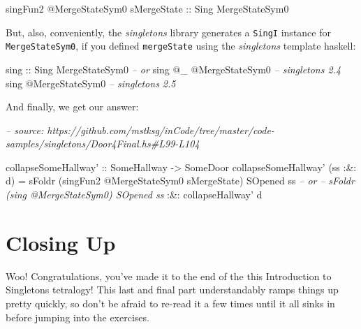 \documentclass[]{article}
\newenvironment{Shaded}{}{}
\newcommand{\CommentTok}[1]{\textcolor[rgb]{0.38,0.63,0.69}{\textit{#1}}}
\newcommand{\DataTypeTok}[1]{\textcolor[rgb]{0.56,0.13,0.00}{#1}}
\newcommand{\FunctionTok}[1]{\textcolor[rgb]{0.02,0.16,0.49}{#1}}
\newcommand{\NormalTok}[1]{#1}
\newcommand{\OtherTok}[1]{\textcolor[rgb]{0.00,0.44,0.13}{#1}}
\begin{document}
\begin{Shaded}
\begin{Highlighting}[]
\NormalTok{singFun2 }\FunctionTok{@}\DataTypeTok{MergeStateSym0}\NormalTok{ sMergeState}
\OtherTok{    ::} \DataTypeTok{Sing} \DataTypeTok{MergeStateSym0}
\end{Highlighting}
\end{Shaded}

But, also, conveniently, the \emph{singletons} library generates a
\texttt{SingI} instance for \texttt{MergeStateSym0}, if you defined
\texttt{mergeState} using the \emph{singletons} template haskell:

\begin{Shaded}
\begin{Highlighting}[]
\OtherTok{sing ::} \DataTypeTok{Sing} \DataTypeTok{MergeStateSym0}
\CommentTok{-- or}
\NormalTok{sing }\FunctionTok{@}\NormalTok{_ }\FunctionTok{@}\DataTypeTok{MergeStateSym0}         \CommentTok{-- singletons 2.4}
\NormalTok{sing }\FunctionTok{@}\DataTypeTok{MergeStateSym0}            \CommentTok{-- singletons 2.5}
\end{Highlighting}
\end{Shaded}

And finally, we get our answer:

\begin{Shaded}
\begin{Highlighting}[]
\CommentTok{-- source: https://github.com/mstksg/inCode/tree/master/code-samples/singletons/Door4Final.hs#L99-L104}

\OtherTok{collapseSomeHallway' ::} \DataTypeTok{SomeHallway} \OtherTok{->} \DataTypeTok{SomeDoor}
\NormalTok{collapseSomeHallway' (ss }\FunctionTok{:&:}\NormalTok{ d) }\FunctionTok{=}
\NormalTok{        sFoldr (singFun2 }\FunctionTok{@}\DataTypeTok{MergeStateSym0}\NormalTok{ sMergeState) }\DataTypeTok{SOpened}\NormalTok{ ss}
     \CommentTok{-- or}
     \CommentTok{-- sFoldr (sing @MergeStateSym0) SOpened ss}
    \FunctionTok{:&:}\NormalTok{ collapseHallway' d}
\end{Highlighting}
\end{Shaded}

\hypertarget{closing-up}{%
\section{Closing Up}\label{closing-up}}

Woo! Congratulations, you've made it to the end of the this Introduction to
Singletons tetralogy! This last and final part understandably ramps things up
pretty quickly, so don't be afraid to re-read it a few times until it all sinks
in before jumping into the exercises.
\end{document}
